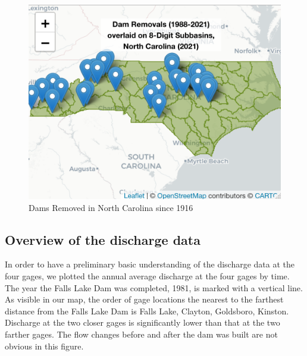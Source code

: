\documentclass[
  12pt,
]{article}
\begin{document}
\begin{figure}
\centering
\includegraphics{"./Output/dam.removal.map.png"}
\caption{Dams Removed in North Carolina since 1916}
\end{figure}

\hypertarget{overview-of-the-discharge-data}{%
\subsection{Overview of the discharge
data}\label{overview-of-the-discharge-data}}

In order to have a preliminary basic understanding of the discharge data
at the four gages, we plotted the annual average discharge at the four
gages by time. The year the Falls Lake Dam was completed, 1981, is
marked with a vertical line. As visible in our map, the order of gage
locations the nearest to the farthest distance from the Falls Lake Dam
is Falls Lake, Clayton, Goldsboro, Kinston. Discharge at the two closer
gages is significantly lower than that at the two farther gages. The
flow changes before and after the dam was built are not obvious in this
figure.
\end{document}
